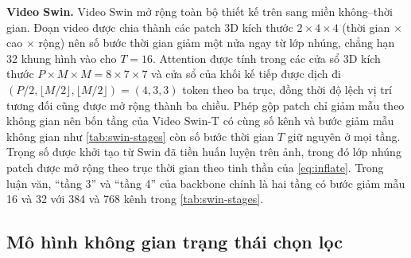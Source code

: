 \textbf{Video Swin.} Video Swin \cite{liu2022videoswin} mở rộng toàn bộ thiết kế trên sang miền không--thời gian. Đoạn video được chia thành các patch 3D kích thước $2 \times 4 \times 4$ (thời gian $\times$ cao $\times$ rộng) nên số bước thời gian giảm một nửa ngay từ lớp nhúng, chẳng hạn 32 khung hình vào cho $T = 16$. Attention được tính trong các cửa sổ 3D kích thước $P \times M \times M = 8 \times 7 \times 7$ và cửa sổ của khối kế tiếp được dịch đi $(P/2, \lfloor M/2 \rfloor, \lfloor M/2 \rfloor) = (4, 3, 3)$ token theo ba trục, đồng thời độ lệch vị trí tương đối cũng được mở rộng thành ba chiều. Phép gộp patch chỉ giảm mẫu theo không gian nên bốn tầng của Video Swin-T có cùng số kênh và bước giảm mẫu không gian như \cref{tab:swin-stages} còn số bước thời gian $T$ giữ nguyên ở mọi tầng. Trọng số được khởi tạo từ Swin đã tiền huấn luyện trên ảnh, trong đó lớp nhúng patch được mở rộng theo trục thời gian theo tinh thần của \cref{eq:inflate}. Trong luận văn, ``tầng 3'' và ``tầng 4'' của backbone chính là hai tầng có bước giảm mẫu 16 và 32 với 384 và 768 kênh trong \cref{tab:swin-stages}.

\subsection{Mô hình không gian trạng thái chọn lọc}
\label{sec:ssm}

